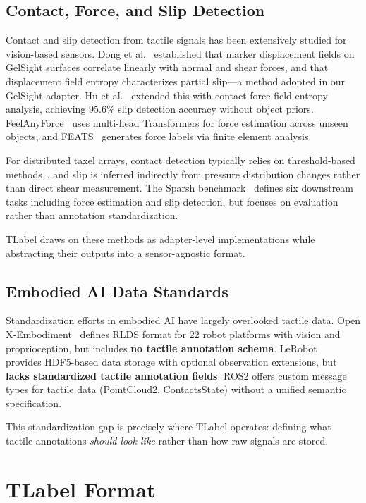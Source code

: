 \documentclass[conference]{IEEEtran}
\begin{document}
\subsection{Contact, Force, and Slip Detection}

Contact and slip detection from tactile signals has been extensively studied for vision-based sensors. Dong et al.~\cite{dong2017gelsight} established that marker displacement fields on GelSight surfaces correlate linearly with normal and shear forces, and that displacement field entropy characterizes partial slip---a method adopted in our GelSight adapter. Hu et al.~\cite{hu2024slip} extended this with contact force field entropy analysis, achieving 95.6\% slip detection accuracy without object priors. FeelAnyForce~\cite{feelanyforce2025} uses multi-head Transformers for force estimation across unseen objects, and FEATS~\cite{feats2024} generates force labels via finite element analysis.

For distributed taxel arrays, contact detection typically relies on threshold-based methods~\cite{paxini2025}, and slip is inferred indirectly from pressure distribution changes rather than direct shear measurement. The Sparsh benchmark~\cite{sparsh2024} defines six downstream tasks including force estimation and slip detection, but focuses on evaluation rather than annotation standardization.

TLabel draws on these methods as adapter-level implementations while abstracting their outputs into a sensor-agnostic format.

\subsection{Embodied AI Data Standards}

Standardization efforts in embodied AI have largely overlooked tactile data. Open X-Embodiment~\cite{openx2024} defines RLDS format for 22 robot platforms with vision and proprioception, but includes \textbf{no tactile annotation schema}. LeRobot~\cite{lerobot2024} provides HDF5-based data storage with optional observation extensions, but \textbf{lacks standardized tactile annotation fields}. ROS2 offers custom message types for tactile data (PointCloud2, ContactsState) without a unified semantic specification.

This standardization gap is precisely where TLabel operates: defining what tactile annotations \emph{should look like} rather than how raw signals are stored.

\section{TLabel Format}
\end{document}
